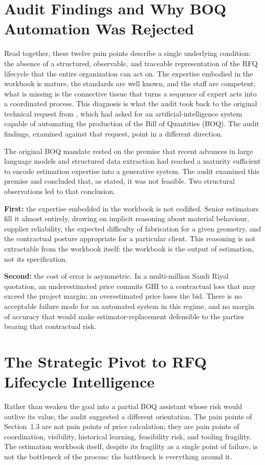 \section{Audit Findings and Why BOQ Automation Was Rejected}
Read together, these twelve pain points describe a single underlying condition: the absence of a structured, observable, and traceable representation of the RFQ lifecycle that the entire organization can act on. The expertise embodied in the workbook is mature, the standards are well known, and the staff are competent; what is missing is the connective tissue that turns a sequence of expert acts into a coordinated process. This diagnosis is what the audit took back to the original technical request from \clientCompany, which had asked for an artificial-intelligence system capable of automating the production of the Bill of Quantities (BOQ). The audit findings, examined against that request, point in a different direction.

The original BOQ mandate rested on the premise that recent advances in large language models and structured data extraction had reached a maturity sufficient to encode estimation expertise into a generative system. The audit examined this premise and concluded that, as stated, it was not feasible. Two structural observations led to that conclusion.

\textbf{First:} the expertise embedded in the workbook is not codified. Senior estimators fill it almost entirely, drawing on implicit reasoning about material behaviour, supplier reliability, the expected difficulty of fabrication for a given geometry, and the contractual posture appropriate for a particular client. This reasoning is not extractable from the workbook itself: the workbook is the output of estimation, not its specification.

\textbf{Second:} the cost of error is asymmetric. In a multi-million Saudi Riyal quotation, an underestimated price commits GHI to a contractual loss that may exceed the project margin; an overestimated price loses the bid. There is no acceptable failure mode for an automated system in this regime, and no margin of accuracy that would make estimator-replacement defensible to the parties bearing that contractual risk.

\section{The Strategic Pivot to RFQ Lifecycle Intelligence}
Rather than weaken the goal into a partial BOQ assistant whose risk would outlive its value, the audit suggested a different orientation. The pain points of Section~1.3 are not pain points of price calculation; they are pain points of coordination, visibility, historical learning, feasibility risk, and tooling fragility. The estimation workbook itself, despite its fragility as a single point of failure, is not the bottleneck of the process: the bottleneck is everything around it.

